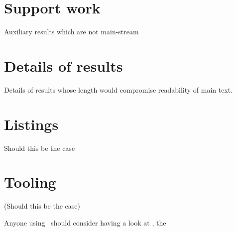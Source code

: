 \documentclass[
  oneside,
  11pt, a4paper,
  footinclude=true,
  headinclude=true,
  cleardoublepage=empty
]{scrbook}
\begin{document}
\chapter{Support work}
	Auxiliary results which are not main-stream

\chapter{Details of results}
         Details of results whose length would compromise readability of main text.

\chapter{Listings}
	Should this be the case

\chapter{Tooling}
	(Should this be the case)

	Anyone using \Latex\ should consider having a look at \TUG,
	the 
	
\end{document}
